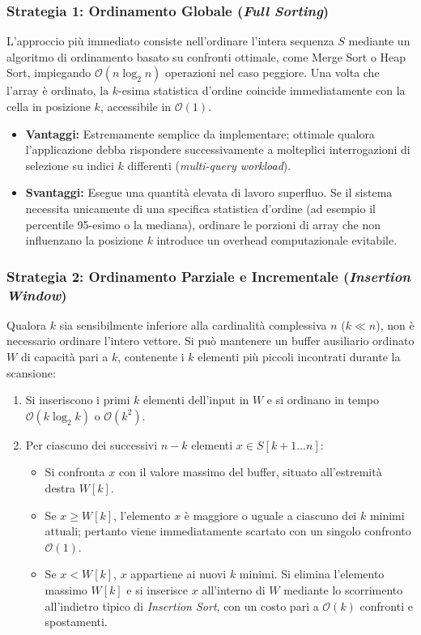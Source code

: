 \subsubsection{Strategia 1: Ordinamento Globale (\textit{Full Sorting})}
L'approccio più immediato consiste nell'ordinare l'intera sequenza $S$ mediante un algoritmo di ordinamento basato su confronti ottimale, come Merge Sort o Heap Sort, impiegando $\mathcal{O}(n \log_2 n)$ operazioni nel caso peggiore. Una volta che l'array è ordinato, la $k$-esima statistica d'ordine coincide immediatamente con la cella in posizione $k$, accessibile in $\mathcal{O}(1)$.

\begin{itemize}
  \item \textbf{Vantaggi:} Estremamente semplice da implementare; ottimale qualora l'applicazione debba rispondere successivamente a molteplici interrogazioni di selezione su indici $k$ differenti (\textit{multi-query workload}).
  \item \textbf{Svantaggi:} Esegue una quantità elevata di lavoro superfluo. Se il sistema necessita unicamente di una specifica statistica d'ordine (ad esempio il percentile 95-esimo o la mediana), ordinare le porzioni di array che non influenzano la posizione $k$ introduce un overhead computazionale evitabile.
\end{itemize}

\subsubsection{Strategia 2: Ordinamento Parziale e Incrementale (\textit{Insertion Window})}
Qualora $k$ sia sensibilmente inferiore alla cardinalità complessiva $n$ ($k \ll n$), non è necessario ordinare l'intero vettore. Si può mantenere un buffer ausiliario ordinato $W$ di capacità pari a $k$, contenente i $k$ elementi più piccoli incontrati durante la scansione:

\begin{enumerate}
  \item Si inseriscono i primi $k$ elementi dell'input in $W$ e si ordinano in tempo $\mathcal{O}(k \log_2 k)$ o $\mathcal{O}(k^2)$.
  \item Per ciascuno dei successivi $n - k$ elementi $x \in S[k+1 \dots n]$:
  \begin{itemize}
    \item Si confronta $x$ con il valore massimo del buffer, situato all'estremità destra $W[k]$.
    \item Se $x \ge W[k]$, l'elemento $x$ è maggiore o uguale a ciascuno dei $k$ minimi attuali; pertanto viene immediatamente scartato con un singolo confronto $\mathcal{O}(1)$.
    \item Se $x < W[k]$, $x$ appartiene ai nuovi $k$ minimi. Si elimina l'elemento massimo $W[k]$ e si inserisce $x$ all'interno di $W$ mediante lo scorrimento all'indietro tipico di \textit{Insertion Sort}, con un costo pari a $\mathcal{O}(k)$ confronti e spostamenti.
  \end{itemize}
\end{enumerate}

